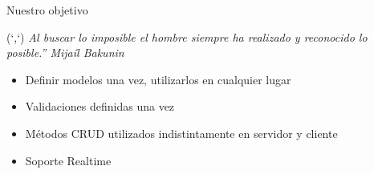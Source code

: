 \documentclass[xcolor=dvipsnames, 14pt]{beamer}
\newenvironment{reference}[2]{%
  \begin{textblock*}{\textwidth}(#1,#2)
      \footnotesize\it\bgroup\color{gray!50!black}}{\egroup\end{textblock*}}
\begin{document}
\begin{frame}{Nuestro objetivo}
\begin{reference}{4mm}{85mm}
``Al buscar lo imposible el hombre siempre ha realizado y reconocido lo posible.'' Mijaíl Bakunin
\end{reference}

\begin{itemize}
    \item Definir modelos una vez, utilizarlos en cualquier lugar
    \item Validaciones definidas una vez
    \item Métodos CRUD utilizados indistintamente en servidor y cliente
    \item Soporte Realtime
\end{itemize}

\end{frame}
\end{document}
